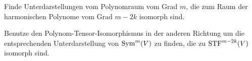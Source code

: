 \begin{sheet}
\begin{problem}[title={Isomorphismus zwischen irreduziblen Darstellungen von Polynomen und Tensoren}]
\begin{subproblem}
Finde Unterdarstellungen vom Polynomraum vom Grad $m$, die zum Raum der harmonischen Polynome vom Grad $m-2k$ isomorph sind.
\end{subproblem}
\begin{subproblem}
Benutze den Polynom-Tensor-Isomorphismus in der anderen Richtung um die entsprechenden Unterdarstellung von $\operatorname{Sym}^m(V)$ zu finden, die zu $\operatorname{STF}^{m-2k}(V)$ isomorph sind.
\end{subproblem}
\end{problem}

\end{sheet}